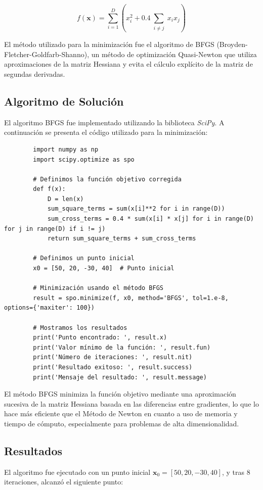 \documentclass{article}
\begin{document}
	$$
	f(\mathbf{x}) = \sum_{i=1}^D \left(x_i^2 + 0.4 \sum_{\substack{i\neq j}} x_i x_j\right)
	$$
	
	El método utilizado para la minimización fue el algoritmo de BFGS (Broyden-Fletcher-Goldfarb-Shanno), un método de optimización Quasi-Newton que utiliza aproximaciones de la matriz Hessiana y evita el cálculo explícito de la matriz de segundas derivadas.
	
	\subsection{Algoritmo de Solución}
	
	El algoritmo BFGS fue implementado utilizando la biblioteca \textit{SciPy}. A continuación se presenta el código utilizado para la minimización:
	
	\begin{verbatim}
		import numpy as np
		import scipy.optimize as spo
		
		# Definimos la función objetivo corregida
		def f(x):
			D = len(x)
			sum_square_terms = sum(x[i]**2 for i in range(D))
			sum_cross_terms = 0.4 * sum(x[i] * x[j] for i in range(D) for j in range(D) if i != j) 
			return sum_square_terms + sum_cross_terms
		
		# Definimos un punto inicial
		x0 = [50, 20, -30, 40]  # Punto inicial
		
		# Minimización usando el método BFGS
		result = spo.minimize(f, x0, method='BFGS', tol=1.e-8, options={'maxiter': 100})
		
		# Mostramos los resultados
		print('Punto encontrado: ', result.x)
		print('Valor mínimo de la función: ', result.fun)
		print('Número de iteraciones: ', result.nit)
		print('Resultado exitoso: ', result.success)
		print('Mensaje del resultado: ', result.message)
	\end{verbatim}
	
	El método BFGS minimiza la función objetivo mediante una aproximación sucesiva de la matriz Hessiana basada en las diferencias entre gradientes, lo que lo hace más eficiente que el Método de Newton en cuanto a uso de memoria y tiempo de cómputo, especialmente para problemas de alta dimensionalidad.
	
	\subsection{Resultados}
	
	El algoritmo fue ejecutado con un punto inicial \(\mathbf{x}_0 = [50, 20, -30, 40]\), y tras 8 iteraciones, alcanzó el siguiente punto:
	
\end{document}
